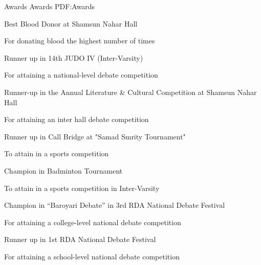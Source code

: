\documentclass[letterpaper,MMMyyyy,nonstopmode]{simpleresumecv}
\begin{document}
\begin{Body}


\Section
{Awards}
{Awards}
{PDF:Awards}

\BulletItem
Best Blood Donor at Shamsun Nahar Hall    
\hfill
{}
\begin{Detail}
\Item
For donating blood the highest number of times
\end{Detail}

\Gap
\BulletItem
Runner up in 14th JUDO IV (Inter-Varsity)     
\hfill
{}
\begin{Detail}
\Item
For attaining a national-level debate competition
\end{Detail}

\Gap
\BulletItem
Runner-up in the Annual Literature & Cultural Competition at Shamsun Nahar Hall  
\hfill
{}
\begin{Detail}
\Item
For attaining an inter hall debate competition
\end{Detail}

\Gap
\BulletItem
Runner up in Call Bridge at "Samad Smrity Tournament"
\hfill
{}
\begin{Detail}
\Item
To attain in a sports competition
\end{Detail}

\Gap
\BulletItem
 Champion in Badminton Tournament
\hfill
{}
\begin{Detail}
\Item
To attain in a sports competition in Inter-Varsity
\end{Detail}

\Gap
\BulletItem
Champion in “Baroyari Debate” in 3rd RDA National Debate Festival
\hfill
{}
\begin{Detail}
\Item
For attaining a college-level national debate competition
\end{Detail}

\Gap
\BulletItem
Runner up in 1st RDA National Debate Festival 
\hfill
{}
\begin{Detail}
\Item
For attaining a school-level national debate competition
\end{Detail}
\endgroup

\end{Body}
\end{document}
